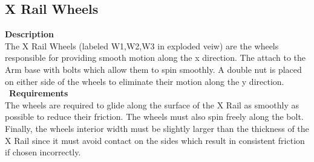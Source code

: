 \documentclass[titlepage]{article}
\begin{document}
\begin{center}
\begin{center}
\begin{center}
\begin{center}
\begin{center}
\begin{center}
\begin{center}
\begin{center}
\begin{center}
\begin{center}
\begin{center}

\subsection{X Rail Wheels}
\textbf{Description}\\
The X Rail Wheels (labeled W1,W2,W3 in exploded veiw) are the wheels responsible for providing smooth motion along the x direction. The attach to the Arm base with bolts which allow them to spin smoothly. A double nut is placed on either side of the wheels to eliminate their motion along the y direction.\\\
\textbf{Requirements}\\
The wheels are required to glide along the surface of the X Rail as smoothly as possible to reduce their friction. The wheels must also spin freely along the bolt. Finally, the wheels interior width must be slightly larger than the thickness of the X Rail since it must avoid contact on the sides which result in consistent friction if chosen incorrectly.
\begin{center}




\newpage

\end{center}
\end{center}
\end{center}
\end{center}
\end{center}
\end{center}
\end{center}
\end{center}
\end{center}
\end{center}
\end{center}
\end{center}
\end{document}
